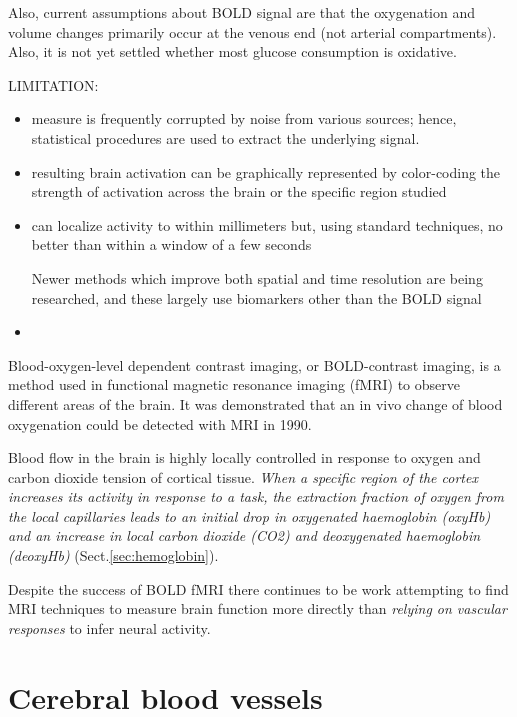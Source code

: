 Also, current assumptions about BOLD signal are that the oxygenation and volume
changes primarily occur at the venous end (not arterial compartments). 
Also, it is not yet settled whether most glucose consumption is oxidative.

LIMITATION:
\begin{itemize}
  \item measure is frequently corrupted by noise from various sources; hence,
  statistical procedures are used to extract the underlying signal.
  
  \item  resulting brain activation can be graphically represented by
  color-coding the strength of activation across the brain or the specific
  region studied
  
  \item can localize activity to within millimeters but, using standard
  techniques, no better than within a window of a few seconds 

Newer methods which improve both spatial and time resolution are being
researched, and these largely use biomarkers other than the BOLD signal


  \item 
\end{itemize}

Blood-oxygen-level dependent contrast imaging, or BOLD-contrast imaging, is a
method used in functional magnetic resonance imaging (fMRI) to observe different
areas of the brain. It was demonstrated that an in vivo change of blood
oxygenation could be detected with MRI in 1990.

Blood flow in the brain is highly locally controlled in response to oxygen and
carbon dioxide tension of cortical tissue. {\it When a specific region of the
cortex increases its activity in response to a task, the extraction fraction of
oxygen from the local capillaries leads to an initial drop in oxygenated
haemoglobin (oxyHb) and an increase in local carbon dioxide (CO2) and
deoxygenated haemoglobin (deoxyHb)} (Sect.\ref{sec:hemoglobin}).

Despite the success of BOLD fMRI there continues to be work attempting to find
MRI techniques to measure brain function more directly than {\it relying on
vascular responses} to infer neural activity.



\section{Cerebral blood vessels}
\label{sec:cerebral-blood-vessel}
\label{sec:blood-vessel-in-cerebral}

